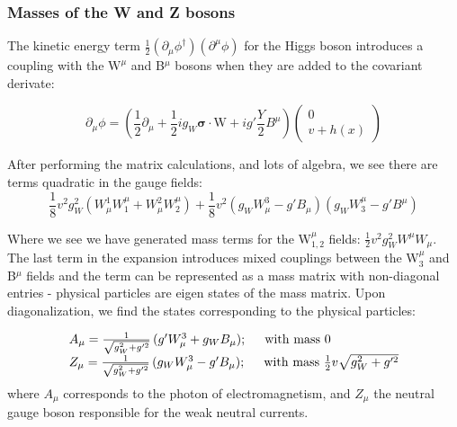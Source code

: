 \subsubsection{Masses of the W and Z bosons}

The kinetic energy term $\frac{1}{2} (\partial_{\mu}\phi^{\dagger})(\partial^{\mu}\phi)$ for the Higgs boson introduces a coupling with the $\bm{\mathrm{W}}^{\mu}$ and B$^{\mu}$ bosons when they are added to the covariant derivate:

\begin{equation}
\partial_{\mu}\phi = (\frac{1}{2}\partial_{\mu} + \frac{1}{2} i g_{W}\bm{\sigma}\cdot\bm{\mathrm{W}} + i g' \frac{Y}{2} B^{\mu})\begin{pmatrix} 0 \\ v + h(x) \end{pmatrix}
\end{equation}

After performing the matrix calculations, and lots of algebra, we see there are terms quadratic in the gauge fields:
\begin{equation}
\frac{1}{8} v^{2} g_{W}^{2} ( W^{1}_{\mu} W_{1}^{\mu} + W^{2}_{\mu} W_{2}^{\mu}) + \frac{1}{8} v^{2} ( g_{W} W^{3}_{\mu} - g'B_{\mu} ) ( g_{W} W_{3}^{\mu} -g' B^{\mu} )
\end{equation}

Where we see we have generated mass terms for the W$^{\mu}_{1,2}$ fields: $\frac{1}{2} v^{2} g_{W}^{2} W^{\mu}W_{\mu}$. The last term in the expansion introduces mixed couplings between the W$_{3}^{\mu}$ and B$^{\mu}$ fields and the term can be represented as a mass matrix with non-diagonal entries - physical particles are eigen states of the mass matrix. Upon diagonalization, we find the states corresponding to the physical particles:

\begin{equation}
\begin{array}{l}
A_{\mu} = \frac{1}{\sqrt{g_{W}^{2} + g'^{2}}} \, (g' W^{3}_{\mu} + g_{W}B_{\mu});\hspace{0.5cm} \mathrm{with\,\,mass}\,\,0\\
Z_{\mu} = \frac{1}{\sqrt{g_{W}^{2} + g'^{2}}} \, (g_{W} W^{3}_{\mu} - g'B_{\mu}); \hspace{0.5cm} \mathrm{with\,\,mass}\,\, \frac{1}{2}v\sqrt{g_{W}^{2} + g'^{2}}
\end{array}
\end{equation}
where $A_{\mu}$ corresponds to the photon of electromagnetism, and $Z_{\mu}$ the neutral gauge boson responsible for the weak neutral currents.

